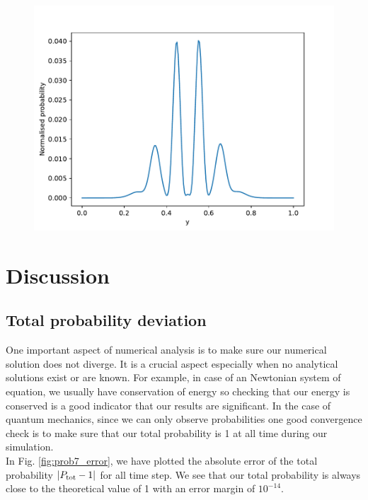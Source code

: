 \documentclass[english,notitlepage,reprint,nofootinbib]{revtex4-2}  %
\begin{document}
	\begin{figure}[H]
		\centering
		\includegraphics[scale=0.55]{figures/problem9_triple_slit.pdf}
		\caption{}
		\label{fig:prob9_triple}
	\end{figure}

	\section{Discussion}\label{sec:discussion}
	
	\subsection{Total probability deviation} \label{subsec:tot_prob_dev}
	
	One important aspect of numerical analysis is to make sure our numerical
	solution does not diverge. It is a crucial aspect especially when no 
	analytical solutions exist or are known. For example, in case of an 
	Newtonian system of equation, we usually have conservation of energy
	so checking that our energy is conserved is a good indicator that our
	results are significant. In the case of quantum mechanics, since we 
	can only observe probabilities one good convergence check is to make sure
	that our total probability is 1 at all time during our simulation. \\
	
	In Fig.	\ref{fig:prob7_error}, we have plotted the absolute error of 
	the total probability $|P_{\rm tot} - 1|$ for all time step. 
	We see that our total probability is always close to the theoretical 
	value of 1 with an error margin of $10^{-14}$.  \\
	
\end{document}
